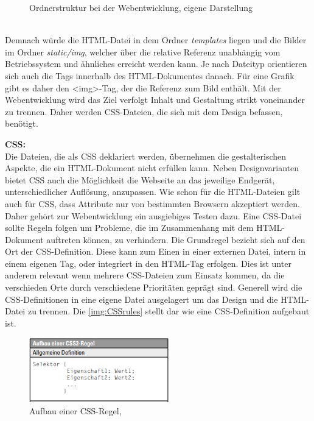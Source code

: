 \documentclass[a4paper,titlepage,halfparskip,12pt]{scrreprt}
\begin{document}
\begin{onehalfspacing}
\begin{figure}[h]
	\caption{Ordnerstruktur bei der Webentwicklung, eigene Darstellung} 
	\label{img:TreeHTMLStruktur}
\end{figure}
\\Demnach würde die \ac{HTML}-Datei in dem Ordner \textit{templates} liegen und die Bilder im Ordner \textit{static/img}, welcher über die relative Referenz unabhängig vom Betriebssystem und ähnliches erreicht werden kann. Je nach Dateityp orientieren sich auch die Tags innerhalb des \ac{HTML}-Dokumentes danach. Für eine Grafik gibt es daher den <img>-Tag, der die Referenz zum Bild enthält. Mit der Webentwicklung wird das Ziel verfolgt Inhalt und Gestaltung strikt voneinander zu trennen. Daher werden \ac{CSS}-Dateien, die sich mit dem Design befassen, benötigt.

\textbf{CSS:}\\
Die Dateien, die als \ac{CSS} deklariert werden, übernehmen die gestalterischen Aspekte, die ein \ac{HTML}-Dokument nicht erfüllen kann. Neben Designvarianten bietet \ac{CSS} auch die Möglichkeit die Webseite an das jeweilige Endgerät, unterschiedlicher Auflösung, anzupassen. Wie schon für die \ac{HTML}-Dateien gilt auch für \ac{CSS}, dass Attribute nur von bestimmten Browsern akzeptiert werden. Daher gehört zur Webentwicklung ein ausgiebiges Testen dazu. Eine \ac{CSS}-Datei sollte Regeln folgen um Probleme, die im Zusammenhang mit dem HTML-Dokument auftreten können, zu verhindern. Die Grundregel bezieht sich auf den Ort der \ac{CSS}-Definition. Diese kann zum Einen in einer externen Datei, intern in einem eigenen Tag, oder integriert in den \ac{HTML}-Tag erfolgen. Dies ist unter anderem relevant wenn mehrere \ac{CSS}-Dateien zum Einsatz kommen, da die verschieden Orte durch verschiedene Prioritäten geprägt sind. Generell wird die \ac{CSS}-Definitionen in eine eigene Datei ausgelagert um das Design und die \ac{HTML}-Datei zu trennen. Die \autoref{img:CSSrules} stellt dar wie eine \ac{CSS}-Definition aufgebaut ist.
\begin{figure}[h]
	\centering
	\includegraphics[scale=2.5]{images/CSS_Definition}
	\caption{Aufbau einer \ac{CSS}-Regel, \cite{buhler2017html5}}
	\label{img:CSSrules}
\end{figure}	

\end{onehalfspacing}
\end{document}
